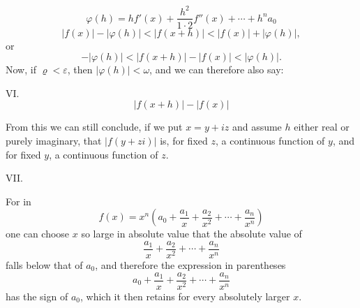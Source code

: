 
\[
 \varphi(h)=h f'(x)+\frac{h^2}{1\cdot2}f''(x)+\cdots+h^n a_0
\]
\[
 |f(x)|-|\varphi(h)|<|f(x+h)|<|f(x)|+|\varphi(h)|,
\]
or
\[
 -|\varphi(h)|<|f(x+h)|-|f(x)|<|\varphi(h)|.
\]
Now, if $\varrho<\varepsilon$, then $|\varphi(h)|<\omega$, and we can therefore also say:

\medskip
\noindent VI. 
\[
 |f(x+h)|-|f(x)|
\]
\medskip

From this we can still conclude, if we put $x=y+iz$ and assume $h$ either real or purely imaginary, that $|f(y+zi)|$ is, for fixed $z$, a continuous function of $y$, and for fixed $y$, a continuous function of $z$.

\medskip
\noindent VII. 

For in
\[
 f(x)=x^n\left(a_0+\frac{a_1}{x}+\frac{a_2}{x^2}+\cdots+\frac{a_n}{x^n}\right)
\]
one can choose $x$ so large in absolute value that the absolute value of
\[
 \frac{a_1}{x}+\frac{a_2}{x^2}+\cdots+\frac{a_n}{x^n}
\]
falls below that of $a_0$, and therefore the expression in parentheses
\[
 a_0+\frac{a_1}{x}+\frac{a_2}{x^2}+\cdots+\frac{a_n}{x^n}
\]
has the sign of $a_0$, which it then retains for every absolutely larger $x$.
